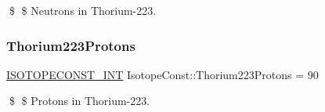 \$ \$ Neutrons in Thorium-\/223. \mbox{\label{group___isotope_const-_thorium-_th223_ga2791c5f579119f8c0d4121a09bce0e3e}} 
\subsubsection{\texorpdfstring{Thorium223\+Protons}{Thorium223Protons}}
{\footnotesize\ttfamily \mbox{\hyperlink{group___isotope_const-_macros_ga5f18360b3e99483a35c32d789e62621c}{I\+S\+O\+T\+O\+P\+E\+C\+O\+N\+S\+T\+\_\+\+I\+NT}} Isotope\+Const\+::\+Thorium223\+Protons = 90}

\$ \$ Protons in Thorium-\/223. 